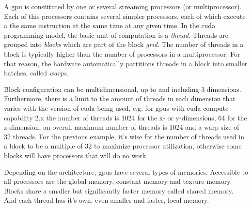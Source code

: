 A \gls{gpu} is constituted by one or several streaming processors (or multiprocessor). Each of this processors contains several simpler processors, each of which execute a the same instruction at the same time at any given time.
In the \gls{cuda} programming model, the basic unit of computation is a \emph{thread}. Threads are grouped into \emph{blocks} which are part of the block \emph{grid}. The number of threads in a block is typically higher than the number of processors in a multiprocessor. For that reason, the hardware automatically partitions threads in a block into smaller batches, called \emph{warps}.

Block configuration can be multidimensional, up to and including 3 dimensions. Furthermore, there is a limit to the amount of threads in each dimension that varies with the version of \gls{cuda} being used, e.g. for \gls{gpu}s with \gls{cuda} compute capability 2.x  the number of threads is 1024 for the x- or y-dimensions, 64 for the z-dimension, an overall maximum number of threads is 1024 and a warp size of 32 threads. For the previous example, it's wise for the number of threads used in a block to be a multiple of 32 to maximize processor utilization, otherwise some blocks will have processors that will do no work.

Depending on the architecture, \gls{gpu}s have several types of memories. Accessible to all processors are the global memory, constant memory and texture memory. Blocks share a smaller but significantly faster memory called shared memory. And each thread has it's own, even smaller and faster, local memory.




